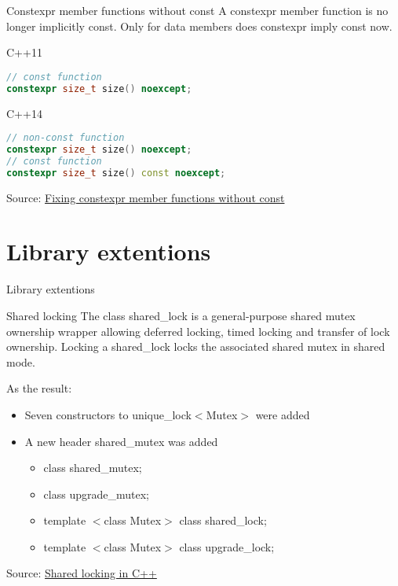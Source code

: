 \documentclass{beamer}
\begin{document}
\begin{frame}[fragile]{Constexpr member functions without const}
A constexpr member function is no longer implicitly const. Only for data members does constexpr imply const now.	

\begin{block}{C++11}
\begin{lstlisting}[firstnumber=1, label=glabels, xleftmargin=5pt, language=C++] 
// const function
constexpr size_t size() noexcept;
\end{lstlisting}
\end{block}

\begin{block}{C++14}
\begin{lstlisting}[firstnumber=1, label=glabels, xleftmargin=5pt, language=C++] 
// non-const function
constexpr size_t size() noexcept;
// const function
constexpr size_t size() const noexcept;
\end{lstlisting}
\end{block}
\vfill
Source: \href{http://www.open-std.org/jtc1/sc22/wg21/docs/papers/2013/n3669.pdf}{Fixing constexpr member functions without const}
\end{frame}

	
\section{Library extentions}


\begin{frame}
\begin{center}
\huge Library extentions
\end{center}
\end{frame}

\begin{frame}{Shared locking}
The class shared\_lock is a general-purpose shared mutex ownership wrapper allowing deferred locking, timed locking and transfer of lock ownership. Locking a shared\_lock locks the associated shared mutex in shared mode.

As the result:
\begin{itemize}
\item Seven constructors to unique\_lock$<$Mutex$>$ were added
\item A new header shared\_mutex was added
\begin{itemize}
\item class shared\_mutex;
\item class upgrade\_mutex;
\item template $<$class Mutex$>$ class shared\_lock;
\item template $<$class Mutex$>$ class upgrade\_lock;
\end{itemize}
\end{itemize}

\vfill
Source: \href{http://www.open-std.org/JTC1/SC22/WG21/docs/papers/2013/n3659.html}{Shared locking in C++}
\end{frame}
\end{document}
